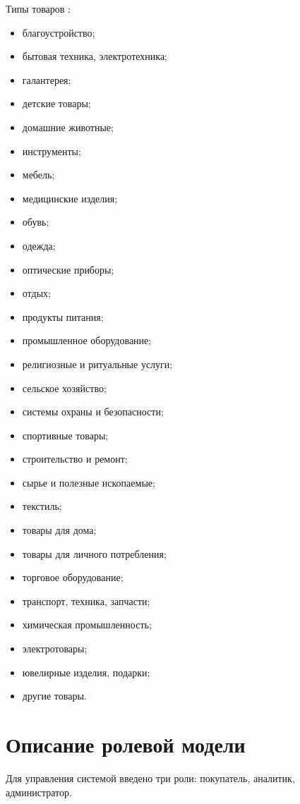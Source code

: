 \documentclass[a4paper,14pt]{extreport}
\begin{document}
Типы товаров \cite{prod_types}:
\begin{itemize}
	\setlength\itemsep{0.05em}
	\item благоустройство;
	\item бытовая техника, электротехника;
	\item галантерея;
	\item детские товары;
	\item домашние животные;
	\item инструменты;
	\item мебель;
	\item медицинские изделия;
	\item обувь;
	\item одежда;
	\item оптические приборы;
	\item отдых;
	\item продукты питания;
	\item промышленное оборудование;
	\item религиозные и ритуальные услуги;
	\item сельское хозяйство;
	\item системы охраны и безопасности;
	\item спортивные товары;
	\item строительство и ремонт;
	\item сырье и полезные ископаемые;
	\item текстиль;
	\item товары для дома;
	\item товары для личного потребления;
	\item торговое оборудование;
	\item транспорт, техника, запчасти;
	\item химическая промышленность;
	\item электротовары;
	\item ювелирные изделия, подарки;
	\item другие товары.
\end{itemize}

\section{Описание ролевой модели}

Для управления системой введено три роли: покупатель, аналитик, администратор.
\end{document}
